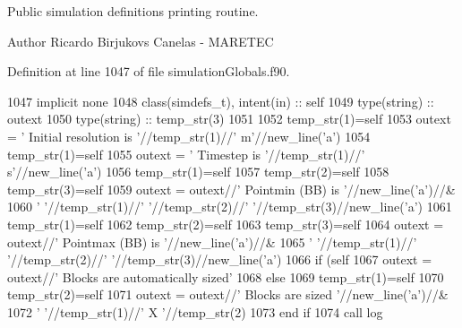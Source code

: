 Public simulation definitions printing routine. 

\begin{DoxyAuthor}{Author}
Ricardo Birjukovs Canelas -\/ M\+A\+R\+E\+T\+EC 
\end{DoxyAuthor}


Definition at line 1047 of file simulation\+Globals.\+f90.


\begin{DoxyCode}
1047     \textcolor{keywordtype}{implicit none}
1048     \textcolor{keywordtype}{class}(simdefs\_t), \textcolor{keywordtype}{intent(in)} :: self
1049     \textcolor{keywordtype}{type}(string) :: outext
1050     \textcolor{keywordtype}{type}(string) :: temp\_str(3)
1051 
1052     temp\_str(1)=self%
1053     outext = \textcolor{stringliteral}{'      Initial resolution is '}//temp\_str(1)//\textcolor{stringliteral}{' m'}//new\_line(\textcolor{stringliteral}{'a'})
1054     temp\_str(1)=self%
1055     outext = \textcolor{stringliteral}{'      Timestep is '}//temp\_str(1)//\textcolor{stringliteral}{' s'}//new\_line(\textcolor{stringliteral}{'a'})
1056     temp\_str(1)=self%
1057     temp\_str(2)=self%
1058     temp\_str(3)=self%
1059     outext = outext//\textcolor{stringliteral}{'       Pointmin (BB) is '}//new\_line(\textcolor{stringliteral}{'a'})//&
1060         \textcolor{stringliteral}{'       '}//temp\_str(1)//\textcolor{stringliteral}{' '}//temp\_str(2)//\textcolor{stringliteral}{' '}//temp\_str(3)//new\_line(\textcolor{stringliteral}{'a'})
1061     temp\_str(1)=self%
1062     temp\_str(2)=self%
1063     temp\_str(3)=self%
1064     outext = outext//\textcolor{stringliteral}{'       Pointmax (BB) is '}//new\_line(\textcolor{stringliteral}{'a'})//&
1065         \textcolor{stringliteral}{'       '}//temp\_str(1)//\textcolor{stringliteral}{' '}//temp\_str(2)//\textcolor{stringliteral}{' '}//temp\_str(3)//new\_line(\textcolor{stringliteral}{'a'})
1066     \textcolor{keywordflow}{if} (self%
1067         outext = outext//\textcolor{stringliteral}{'       Blocks are automatically sized'}
1068     \textcolor{keywordflow}{else}
1069         temp\_str(1)=self%
1070         temp\_str(2)=self%
1071         outext = outext//\textcolor{stringliteral}{'       Blocks are sized '}//new\_line(\textcolor{stringliteral}{'a'})//&
1072             \textcolor{stringliteral}{'       '}//temp\_str(1)//\textcolor{stringliteral}{' X '}//temp\_str(2)
1073 \textcolor{keywordflow}{    end if}
1074     \textcolor{keyword}{call }log%
\end{DoxyCode}
\mbox{\label{namespacesimulationglobals__mod_ab67964fe7c3fb20a4ce0b4193520aa1d}} 

